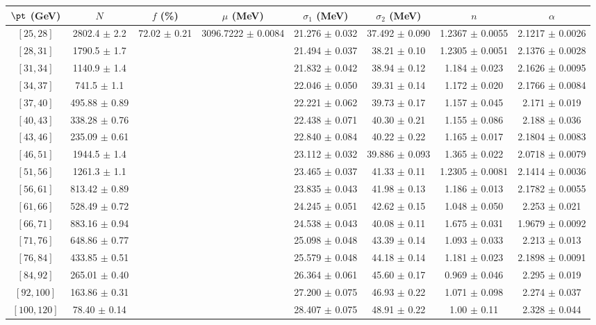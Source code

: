 \begin{tabular}{c||c|c|c|c|c|c|c}
$\pt$ (GeV) & $N$ & $f$ (\%) & $\mu$ (MeV) & $\sigma_1$ (MeV) & $\sigma_2$ (MeV) & $n$ & $\alpha$ \\
\hline
$[25, 28]$ & 2802.4 $\pm$ 2.2 & \multirow{17}{*}{72.02 $\pm$ 0.21} & \multirow{17}{*}{3096.7222 $\pm$ 0.0084} & 21.276 $\pm$ 0.032 & 37.492 $\pm$ 0.090 & 1.2367 $\pm$ 0.0055 & 2.1217 $\pm$ 0.0026\\
$[28, 31]$ & 1790.5 $\pm$ 1.7 &  &  & 21.494 $\pm$ 0.037 & 38.21 $\pm$ 0.10 & 1.2305 $\pm$ 0.0051 & 2.1376 $\pm$ 0.0028\\
$[31, 34]$ & 1140.9 $\pm$ 1.4 &  &  & 21.832 $\pm$ 0.042 & 38.94 $\pm$ 0.12 & 1.184 $\pm$ 0.023 & 2.1626 $\pm$ 0.0095\\
$[34, 37]$ & 741.5 $\pm$ 1.1 &  &  & 22.046 $\pm$ 0.050 & 39.31 $\pm$ 0.14 & 1.172 $\pm$ 0.020 & 2.1766 $\pm$ 0.0084\\
$[37, 40]$ & 495.88 $\pm$ 0.89 &  &  & 22.221 $\pm$ 0.062 & 39.73 $\pm$ 0.17 & 1.157 $\pm$ 0.045 & 2.171 $\pm$ 0.019\\
$[40, 43]$ & 338.28 $\pm$ 0.76 &  &  & 22.438 $\pm$ 0.071 & 40.30 $\pm$ 0.21 & 1.155 $\pm$ 0.086 & 2.188 $\pm$ 0.036\\
$[43, 46]$ & 235.09 $\pm$ 0.61 &  &  & 22.840 $\pm$ 0.084 & 40.22 $\pm$ 0.22 & 1.165 $\pm$ 0.017 & 2.1804 $\pm$ 0.0083\\
$[46, 51]$ & 1944.5 $\pm$ 1.4 &  &  & 23.112 $\pm$ 0.032 & 39.886 $\pm$ 0.093 & 1.365 $\pm$ 0.022 & 2.0718 $\pm$ 0.0079\\
$[51, 56]$ & 1261.3 $\pm$ 1.1 &  &  & 23.465 $\pm$ 0.037 & 41.33 $\pm$ 0.11 & 1.2305 $\pm$ 0.0081 & 2.1414 $\pm$ 0.0036\\
$[56, 61]$ & 813.42 $\pm$ 0.89 &  &  & 23.835 $\pm$ 0.043 & 41.98 $\pm$ 0.13 & 1.186 $\pm$ 0.013 & 2.1782 $\pm$ 0.0055\\
$[61, 66]$ & 528.49 $\pm$ 0.72 &  &  & 24.245 $\pm$ 0.051 & 42.62 $\pm$ 0.15 & 1.048 $\pm$ 0.050 & 2.253 $\pm$ 0.021\\
$[66, 71]$ & 883.16 $\pm$ 0.94 &  &  & 24.538 $\pm$ 0.043 & 40.08 $\pm$ 0.11 & 1.675 $\pm$ 0.031 & 1.9679 $\pm$ 0.0092\\
$[71, 76]$ & 648.86 $\pm$ 0.77 &  &  & 25.098 $\pm$ 0.048 & 43.39 $\pm$ 0.14 & 1.093 $\pm$ 0.033 & 2.213 $\pm$ 0.013\\
$[76, 84]$ & 433.85 $\pm$ 0.51 &  &  & 25.579 $\pm$ 0.048 & 44.18 $\pm$ 0.14 & 1.181 $\pm$ 0.023 & 2.1898 $\pm$ 0.0091\\
$[84, 92]$ & 265.01 $\pm$ 0.40 &  &  & 26.364 $\pm$ 0.061 & 45.60 $\pm$ 0.17 & 0.969 $\pm$ 0.046 & 2.295 $\pm$ 0.019\\
$[92, 100]$ & 163.86 $\pm$ 0.31 &  &  & 27.200 $\pm$ 0.075 & 46.93 $\pm$ 0.22 & 1.071 $\pm$ 0.098 & 2.274 $\pm$ 0.037\\
$[100, 120]$ & 78.40 $\pm$ 0.14 &  &  & 28.407 $\pm$ 0.075 & 48.91 $\pm$ 0.22 & 1.00 $\pm$ 0.11 & 2.328 $\pm$ 0.044\\
\end{tabular}
